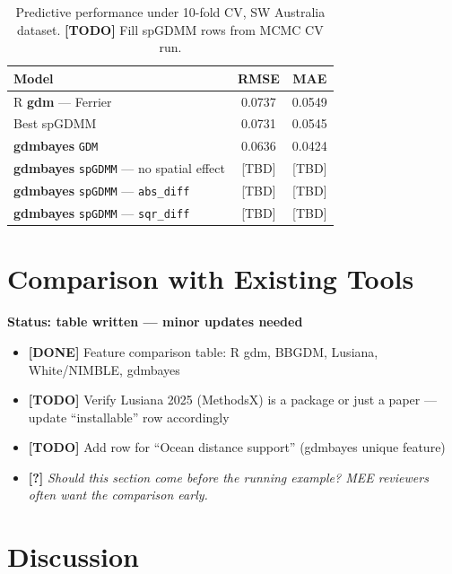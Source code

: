 \documentclass[11pt,a4paper]{article}
\newcommand{\done}[1]{{\color{donegreen}\textbf{[DONE]} #1}}
\newcommand{\todo}[1]{{\color{todored}\textbf{[TODO]} #1}}
\newcommand{\question}[1]{{\color{questionblue}\textbf{[?]} \textit{#1}}}
\newenvironment{scaffold}[1]{%
  \begin{mdframed}[backgroundcolor=gray!6, linecolor=gray!30,
                   leftmargin=0pt, rightmargin=0pt,
                   innerleftmargin=8pt, innerrightmargin=8pt,
                   innertopmargin=6pt, innerbottommargin=6pt]
  \noindent\textbf{#1}\par\vspace{2pt}
  \begin{itemize}[leftmargin=1.4em, topsep=2pt, itemsep=1pt, parsep=0pt]
}{%
  \end{itemize}
  \end{mdframed}
  \vspace{4pt}
}
\begin{document}
\begin{table}[h]
  \centering
  \caption{Predictive performance under 10-fold CV, SW Australia dataset.
    \todo{Fill spGDMM rows from MCMC CV run.}}
  \label{tab:benchmark}
  \begin{tabular}{lcc}
    \toprule
    Model & RMSE & MAE \\
    \midrule
    R \textbf{gdm} --- Ferrier \citep{white2024}              & 0.0737 & 0.0549 \\
    Best spGDMM \citep{white2024}                             & 0.0731 & 0.0545 \\
    \textbf{gdmbayes} \texttt{GDM}                           & 0.0636 & 0.0424 \\
    \textbf{gdmbayes} \texttt{spGDMM} --- no spatial effect  & [TBD]  & [TBD]  \\
    \textbf{gdmbayes} \texttt{spGDMM} --- \texttt{abs\_diff} & [TBD]  & [TBD]  \\
    \textbf{gdmbayes} \texttt{spGDMM} --- \texttt{sqr\_diff} & [TBD]  & [TBD]  \\
    \bottomrule
  \end{tabular}
\end{table}


\section{Comparison with Existing Tools}

\begin{scaffold}{Status: table written --- minor updates needed}
  \item \done{Feature comparison table: R gdm, BBGDM, Lusiana, White/NIMBLE,
    gdmbayes}
  \item \todo{Verify Lusiana 2025 (MethodsX) is a package or just a paper ---
    update ``installable'' row accordingly}
  \item \todo{Add row for ``Ocean distance support'' (gdmbayes unique feature)}
  \item \question{Should this section come before the running example?
    MEE reviewers often want the comparison early.}
\end{scaffold}


\section{Discussion}
\end{document}
